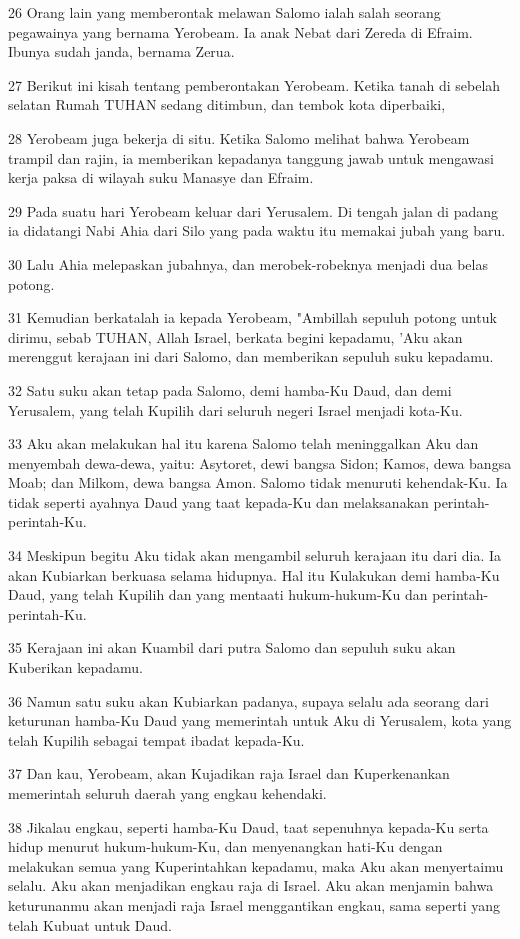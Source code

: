 \par 26 Orang lain yang memberontak melawan Salomo ialah salah seorang pegawainya yang bernama Yerobeam. Ia anak Nebat dari Zereda di Efraim. Ibunya sudah janda, bernama Zerua.
\par 27 Berikut ini kisah tentang pemberontakan Yerobeam. Ketika tanah di sebelah selatan Rumah TUHAN sedang ditimbun, dan tembok kota diperbaiki,
\par 28 Yerobeam juga bekerja di situ. Ketika Salomo melihat bahwa Yerobeam trampil dan rajin, ia memberikan kepadanya tanggung jawab untuk mengawasi kerja paksa di wilayah suku Manasye dan Efraim.
\par 29 Pada suatu hari Yerobeam keluar dari Yerusalem. Di tengah jalan di padang ia didatangi Nabi Ahia dari Silo yang pada waktu itu memakai jubah yang baru.
\par 30 Lalu Ahia melepaskan jubahnya, dan merobek-robeknya menjadi dua belas potong.
\par 31 Kemudian berkatalah ia kepada Yerobeam, "Ambillah sepuluh potong untuk dirimu, sebab TUHAN, Allah Israel, berkata begini kepadamu, 'Aku akan merenggut kerajaan ini dari Salomo, dan memberikan sepuluh suku kepadamu.
\par 32 Satu suku akan tetap pada Salomo, demi hamba-Ku Daud, dan demi Yerusalem, yang telah Kupilih dari seluruh negeri Israel menjadi kota-Ku.
\par 33 Aku akan melakukan hal itu karena Salomo telah meninggalkan Aku dan menyembah dewa-dewa, yaitu: Asytoret, dewi bangsa Sidon; Kamos, dewa bangsa Moab; dan Milkom, dewa bangsa Amon. Salomo tidak menuruti kehendak-Ku. Ia tidak seperti ayahnya Daud yang taat kepada-Ku dan melaksanakan perintah-perintah-Ku.
\par 34 Meskipun begitu Aku tidak akan mengambil seluruh kerajaan itu dari dia. Ia akan Kubiarkan berkuasa selama hidupnya. Hal itu Kulakukan demi hamba-Ku Daud, yang telah Kupilih dan yang mentaati hukum-hukum-Ku dan perintah-perintah-Ku.
\par 35 Kerajaan ini akan Kuambil dari putra Salomo dan sepuluh suku akan Kuberikan kepadamu.
\par 36 Namun satu suku akan Kubiarkan padanya, supaya selalu ada seorang dari keturunan hamba-Ku Daud yang memerintah untuk Aku di Yerusalem, kota yang telah Kupilih sebagai tempat ibadat kepada-Ku.
\par 37 Dan kau, Yerobeam, akan Kujadikan raja Israel dan Kuperkenankan memerintah seluruh daerah yang engkau kehendaki.
\par 38 Jikalau engkau, seperti hamba-Ku Daud, taat sepenuhnya kepada-Ku serta hidup menurut hukum-hukum-Ku, dan menyenangkan hati-Ku dengan melakukan semua yang Kuperintahkan kepadamu, maka Aku akan menyertaimu selalu. Aku akan menjadikan engkau raja di Israel. Aku akan menjamin bahwa keturunanmu akan menjadi raja Israel menggantikan engkau, sama seperti yang telah Kubuat untuk Daud.
